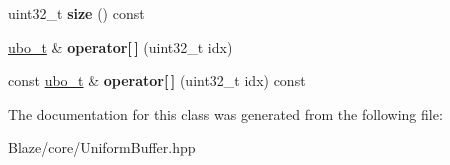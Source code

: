 \begin{DoxyCompactItemize}
\mbox{\label{classblaze_1_1UBOVector_a80d18385f477f31d26b6353afa2bfd99}} 
uint32\+\_\+t {\bfseries size} () const
\item 
\mbox{\label{classblaze_1_1UBOVector_a1c5ec068f74fcaf7cbf5ee80d7194349}} 
\hyperlink{classblaze_1_1UBO}{ubo\+\_\+t} \& {\bfseries operator\mbox{[}$\,$\mbox{]}} (uint32\+\_\+t idx)
\item 
\mbox{\label{classblaze_1_1UBOVector_ab8ed2d3a9fb0b23f32341795dc4e0879}} 
const \hyperlink{classblaze_1_1UBO}{ubo\+\_\+t} \& {\bfseries operator\mbox{[}$\,$\mbox{]}} (uint32\+\_\+t idx) const
\end{DoxyCompactItemize}


The documentation for this class was generated from the following file\+:\begin{DoxyCompactItemize}
\item 
Blaze/core/Uniform\+Buffer.\+hpp\end{DoxyCompactItemize}
